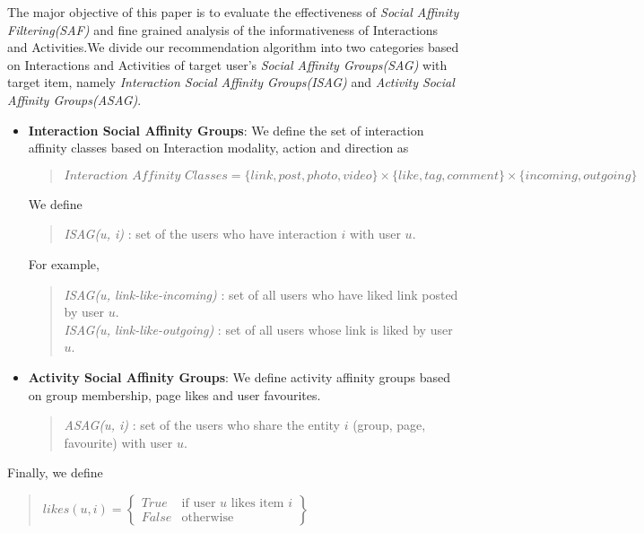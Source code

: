 
\cite{Panigrahy2012ubr}
\cite{Goel2012structure}
\cite{Wilson2012BSG}

The major objective of this paper is to evaluate the effectiveness of \textit{Social Affinity Filtering(SAF)} and fine grained 
analysis of the informativeness of Interactions and Activities.We divide our recommendation algorithm into two categories based 
on Interactions and Activities of target user's \textit{ Social Affinity Groups(SAG)} with target item, 
namely \textit{Interaction  Social Affinity Groups(ISAG)} and \textit{Activity Social Affinity Groups(ASAG)}.

\begin{itemize}
  \item \textbf{Interaction  Social Affinity Groups}: We define the set of interaction affinity classes based on 
  Interaction modality, action and direction as
  \begin{quote}
  \begin{math}
  	\textit{Interaction Affinity Classes} = \{link, post, photo, video\} \times \{like, tag, comment\} \times \{incoming, outgoing\}
  \end{math}
  \end{quote}
  We define 
  \begin{quote}
  \textit{ISAG(u, i)} : set of the users who have interaction $i$ with user $u$.
  \end{quote}
   For example,
   \begin{quote}
   
   \textit{ISAG(u, link-like-incoming)} : set of all users who have liked link posted by user $u$. \\
   \textit{ISAG(u, link-like-outgoing)} : set of all users whose link is liked by user $u$. \\
   \end{quote}
\item \textbf{Activity Social Affinity Groups}: We define activity affinity groups based on group membership, page likes and user favourites.
	\begin{quote}
	\textit{ASAG(u, i)} : set of the users who share the entity $i$ (group, page, favourite) with user $u$.   
	\end{quote}
\end{itemize}
Finally, we define
\begin{quote}
\begin{math}
likes(u,i) =  \begin{Bmatrix}
	  True & \text{if user $u$ likes item $i$}\\
	  False & \text{otherwise}
	  \end{Bmatrix}
\end{math}
\end{quote}
